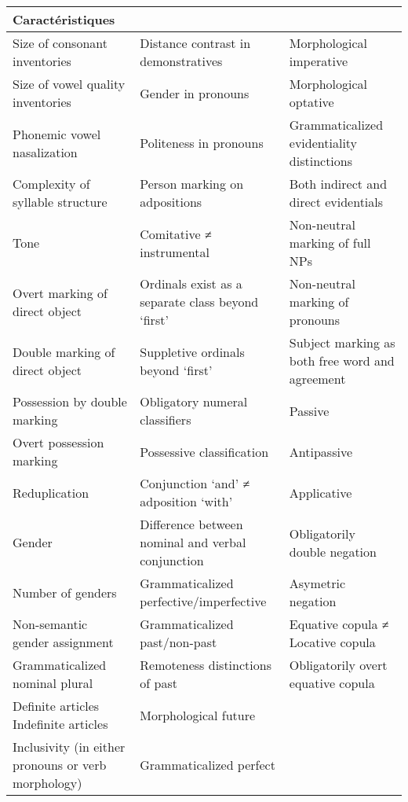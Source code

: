 \documentclass[a4paper, twoside]{article}
\begin{document}
    \begin{table}
        \centering
        \begin{tabulary}{\textwidth}{LLL}
            \toprule
            \textbf{Caractéristiques} & \textbf{} & \textbf{} \\
            \midrule
            Size of consonant inventories & Distance contrast in demonstratives & Morphological imperative \\
            Size of vowel quality inventories & Gender in pronouns & Morphological optative \\
            Phonemic vowel nasalization & Politeness in pronouns & Grammaticalized evidentiality distinctions \\
            Complexity of syllable structure & Person marking on adpositions & Both indirect and direct evidentials \\
            Tone & Comitative ≠ instrumental & Non-neutral marking of full NPs \\
            Overt marking of direct object & Ordinals exist as a separate class beyond ‘first’ & Non-neutral marking of pronouns \\
            Double marking of direct object & Suppletive ordinals beyond ‘first’ & Subject marking as both free word and agreement \\
            Possession by double marking & Obligatory numeral classifiers & Passive \\
            Overt possession marking & Possessive classification & Antipassive \\
            Reduplication & Conjunction ‘and’ ≠ adposition ‘with’ & Applicative \\
            Gender & Difference between nominal and verbal conjunction & Obligatorily double negation \\
            Number of genders & Grammaticalized perfective/imperfective & Asymetric negation \\
            Non-semantic gender assignment & Grammaticalized past/non-past & Equative copula ≠ Locative copula \\
            Grammaticalized nominal plural & Remoteness distinctions of past & Obligatorily overt equative copula \\
            Definite articles Indefinite articles & Morphological future &  \\
            Inclusivity (in either pronouns or verb morphology) & Grammaticalized perfect &  \\
            \bottomrule
        \end{tabulary}
        \caption{}
        \label{tab:}
    \end{table}
    
\end{document}

